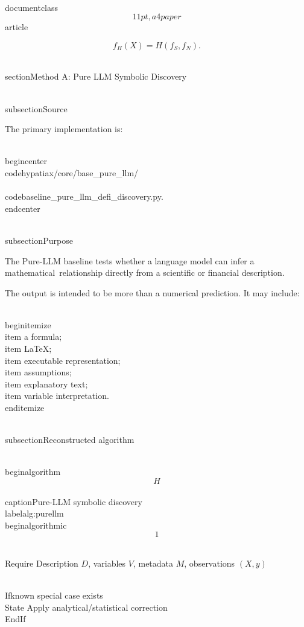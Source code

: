 \\documentclass\[11pt,a4paper\]{article}
\begin{document}
 $$
f_H(X)
=
H(f_S,f_N).
$$

 \\section{Method A: Pure LLM Symbolic Discovery}\

 \\subsection{Source}

 The primary implementation is:

 \\begin{center}\
 \\code{hypatiax/core/base\_pure\_llm/}\\\
 \\code{baseline\_pure\_llm\_defi\_discovery.py}.\
 \\end{center}

 \\subsection{Purpose}

 The Pure-LLM baseline tests whether a language model can infer a mathematical\
 relationship directly from a scientific or financial description.

 The output is intended to be more than a numerical prediction. It may include:

 \\begin{itemize}\
 \\item a formula;\
 \\item LaTeX;\
 \\item executable representation;\
 \\item assumptions;\
 \\item explanatory text;\
 \\item variable interpretation.\
 \\end{itemize}

 \\subsection{Reconstructed algorithm}

 \\begin{algorithm}\[H\]\
 \\caption{Pure-LLM symbolic discovery}\
 \\label{alg:purellm}\
 \\begin{algorithmic}\[1\]

 \\Require Description $D$, variables $V$, metadata $M$, observations $(X,y)$

 \\If{known special case exists}\
 \\State Apply analytical/statistical correction\
 \\EndIf
\end{document}
